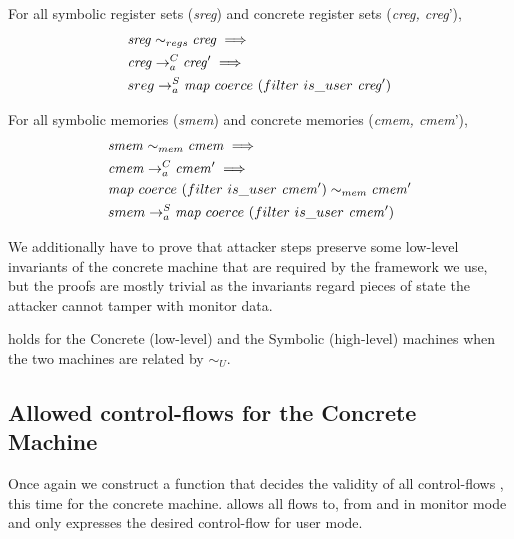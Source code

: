 \begin{lemma}
\label{creg_simulation}
  For all symbolic register sets (\textit{sreg})
  and concrete register sets (\textit{creg, creg}'),
  \begin{align*}
    & \mathit{sreg} \sim_{regs} \mathit{creg} \implies \\
    & \stepa{\mathit{creg}}{\mathit{creg}'}{C} \implies \\
    & \stepa{sreg}{\mathit{map}~coerce~(filter~is\_user~\mathit{creg}')}{S}
  \end{align*}
\end{lemma}

\begin{lemma}
\label{cmem_simulation}
  For all symbolic memories (\textit{smem})
  and concrete memories (\textit{cmem, cmem}'),
  \begin{align*}
    & \mathit{smem} \sim_{mem} \mathit{cmem} \implies \\
    & \stepa{\mathit{cmem}}{\mathit{cmem}'}{C} \implies \\
    & \mathit{map}~coerce~(filter~is\_user~\mathit{cmem}') \sim_{mem} 
       \mathit{cmem}' \\
    & \stepa{smem}{\mathit{map}~coerce~(filter~is\_user~\mathit{cmem}')}{S}
  \end{align*}
\end{lemma}

We additionally have to prove that attacker steps preserve some low-level
invariants of the concrete machine that are required by the framework we
use, but the proofs are mostly trivial as the invariants regard pieces of
state the attacker cannot tamper with \EG monitor data.

\begin{theorem}
\label{simulation_CS_attacker}
 holds for the Concrete (low-level) and
the Symbolic (high-level) machines when the two machines are related
by $\sim_U$.
\end{theorem}

\subsection{Allowed control-flows for the Concrete Machine}
\label{sec:concrete_flow}

Once again we construct a function that decides the validity of all
control-flows , this time for the concrete machine. 
allows all flows to, from and in monitor mode and only expresses
the desired control-flow for user mode.

